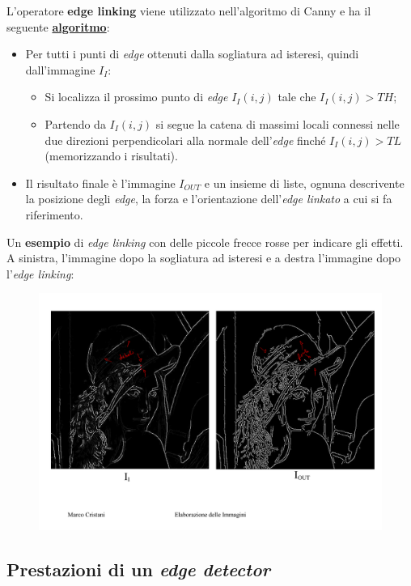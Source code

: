 \documentclass[a4paper]{article}
\begin{document}
	L'operatore \textcolor{Red3}{\textbf{edge linking}} viene utilizzato nell'algoritmo di Canny e ha il seguente \textbf{\underline{algoritmo}}:
	\begin{itemize}
		\item Per tutti i punti di \emph{edge} ottenuti dalla sogliatura ad isteresi, quindi dall'immagine $I_{I}$:
		\begin{itemize}
			\item Si localizza il prossimo punto di \emph{edge} $I_{I}\left(i,j\right)$ tale che $I_{I}\left(i,j\right) > TH$;
			\item Partendo da $I_{I}\left(i,j\right)$ si segue la catena di massimi locali connessi nelle due direzioni perpendicolari alla normale dell'\emph{edge} finché $I_{I}\left(i,j\right) > TL$ (memorizzando i risultati).
		\end{itemize}
	
		\item Il risultato finale è l'immagine $I_{OUT}$ e un insieme di liste, ognuna descrivente la posizione degli \emph{edge}, la forza e l'orientazione dell'\emph{edge linkato} a cui si fa riferimento.
	\end{itemize}
	Un \textbf{esempio} di \emph{edge linking} con delle piccole frecce rosse per indicare gli effetti. A sinistra, l'immagine dopo la sogliatura ad isteresi e a destra l'immagine dopo l'\emph{edge linking}:
	\begin{figure}[!htp]
		\centering
		\includegraphics[width=\textwidth]{img/edge_linking_1.pdf}
	\end{figure}\newpage

	\subsection{Prestazioni di un \emph{edge detector}}
	
\end{document}
